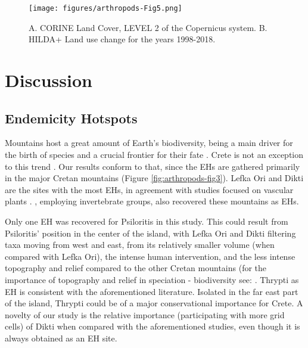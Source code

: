    \begin{figure}[ht]
      \centering
      \texttt{[image: figures/arthropods-Fig5.png]}
      \caption[Land Use of Crete and the changes]{A. CORINE Land Cover, LEVEL 2 of the Copernicus system. B. HILDA+ Land use change for the years 1998-2018.}
      \label{fig:arthropods-fig5}
   \end{figure}


\section{Discussion}
\label{sec:arthropods-discussion}

    \subsection{Endemicity Hotspots}
    \label{subsec:arthropods-Endemicity-Hotspots}

Mountains host a great amount of Earth’s biodiversity, being a main driver for
the birth of species \parencite{antonelli2018geological,noroozi2018hotspots,rahbek2019building,Rahbek2019}
and a crucial frontier for their fate \parencite{steinbauer2018accelerated,urban2018escalator}.
Crete is not an exception to this trend \parencite{kougioumoutzis2020plant,trigas2013elevational}.
Our results conform to that, since the EHs are gathered primarily in the major
Cretan mountains (Figure \ref{fig:arthropods-fig3}). Lefka Ori and Dikti are the sites with the most
EHs, in agreement with studies focused on vascular plants \parencite{dimitrakopoulos2004questioning,kougioumoutzis2020plant}.
\textcite{sfenthourakis2001hotspots}, employing invertebrate groups, also recovered these mountains as EHs.

Only one EH was recovered for Psiloritis in this study. This could result from
Psiloritis’ position in the center of the island, with Lefka Ori and Dikti
filtering taxa moving from west and east, from its relatively smaller volume
(when compared with Lefka Ori), the intense human intervention, and the less
intense topography and relief compared to the other Cretan mountains (for the
importance of topography and relief in speciation - biodiversity see: \textcite{igea2021global,muellner-riehl2019mountains,stuessy2006anagenetic}.
Thrypti as EH is consistent with the aforementioned literature. Isolated in the
far east part of the island, Thrypti could be of a major conservational importance for Crete.
A novelty of our study is the relative importance (participating with more grid cells)
of Dikti when compared with the aforementioned studies, even though it is always obtained as an EH site. 

